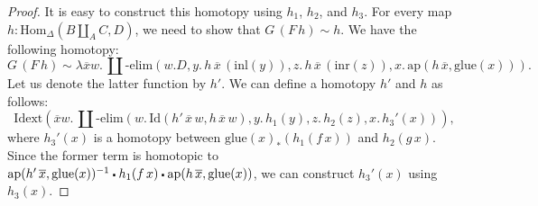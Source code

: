 \documentclass[reqno]{amsart}
\theoremstyle{definition}
\theoremstyle{remark}
\newcommand{\fs}[1]{\mathrm{#1}}
\newcommand{\Hom}{\fs{Hom}}
\newcommand{\Id}{\fs{Id}}
\newcommand{\sym}[1]{#1^{-1}}
\newcommand{\pmap}{\fs{ap}}
\numberwithin{figure}{section}
\newcommand{\ct}{%
  \mathchoice{\mathbin{\raisebox{0.25ex}{$\displaystyle\centerdot$}}}%
             {\mathbin{\raisebox{0.25ex}{$\centerdot$}}}%
             {\mathbin{\raisebox{0.25ex}{$\scriptstyle\,\centerdot\,$}}}%
             {\mathbin{\raisebox{0.25ex}{$\scriptscriptstyle\,\centerdot\,$}}}
}
\begin{document}
\begin{proof}
It is easy to construct this homotopy using $h_1$, $h_2$, and $h_3$.
For every map $h : \Hom_\Delta(B \amalg_A C, D)$, we need to show that $G\,(F\,h) \sim h$.
We have the following homotopy:
\[ G\,(F\,h) \sim \lambda \overline{x} w.\,\amalg\text{-}\fs{elim}(w.D, y.\,h\,\overline{x}\,(\fs{inl}(y)), z.\,h\,\overline{x}\,(\fs{inr}(z)), x.\,\pmap(h\,\overline{x}, \fs{glue}(x))). \]
Let us denote the latter function by $h'$.
We can define a homotopy $h'$ and $h$ as follows:
\[ \fs{Idext}(\overline{x} w.\,\amalg\text{-}\fs{elim}(w.\,\Id(h'\,\overline{x}\,w,h\,\overline{x}\,w), y.\,h_1(y), z.\,h_2(z), x.\,h_3'(x))), \]
where $h_3'(x)$ is a homotopy between $\fs{glue}(x)_*(h_1(f\,x))$ and $h_2(g\,x)$.
Since the former term is homotopic to $\sym{\pmap(h'\,\overline{x},\fs{glue}(x))} \ct h_1(f\,x) \ct \pmap(h\,\overline{x},\fs{glue}(x))$, we can construct $h_3'(x)$ using $h_3(x)$.


\end{proof}
\end{document}
